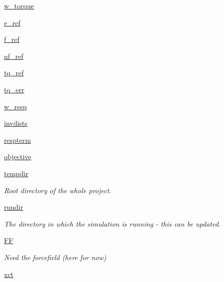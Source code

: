 \begin{DoxyCompactItemize}
\hyperlink{classforcebalance_1_1abinitio_1_1AbInitio_ab4468582c2c010bec490e65a34cdc40a}{w\-\_\-torque}
\item 
\hyperlink{classforcebalance_1_1abinitio_1_1AbInitio_a0fa6ba3ce272657e4f284267b35574ad}{e\-\_\-ref}
\item 
\hyperlink{classforcebalance_1_1abinitio_1_1AbInitio_a945a7463f68474234fa8fdfe93888ff1}{f\-\_\-ref}
\item 
\hyperlink{classforcebalance_1_1abinitio_1_1AbInitio_ad83ddb614190a3c3e647060ce3e063ad}{nf\-\_\-ref}
\item 
\hyperlink{classforcebalance_1_1abinitio_1_1AbInitio_a35ffa4510b557dd4fbce2cd8276fa09b}{tq\-\_\-ref}
\item 
\hyperlink{classforcebalance_1_1abinitio_1_1AbInitio_a36857e469f48d8bddbd3b288a92cac10}{tq\-\_\-err}
\item 
\hyperlink{classforcebalance_1_1abinitio_1_1AbInitio_ab949767e48e84f747f0e84c304d80004}{w\-\_\-resp}
\item 
\hyperlink{classforcebalance_1_1abinitio_1_1AbInitio_ac90a96916a049717e14bc1f757577f24}{invdists}
\item 
\hyperlink{classforcebalance_1_1abinitio_1_1AbInitio_ac4f8e85daeccb2e46b724eddc76d38e1}{respterm}
\item 
\hyperlink{classforcebalance_1_1abinitio_1_1AbInitio_ae27974d01fbc7d485ce3e049a54943bc}{objective}
\item 
\hyperlink{classforcebalance_1_1target_1_1Target_aede2856573b890cd47054ad36937d6f6}{tempdir}
\begin{DoxyCompactList}\small\item\em \-Root directory of the whole project. \end{DoxyCompactList}\item 
\hyperlink{classforcebalance_1_1target_1_1Target_a1da470037ef61c22dc44beb85cfa01a9}{rundir}
\begin{DoxyCompactList}\small\item\em \-The directory in which the simulation is running -\/ this can be updated. \end{DoxyCompactList}\item 
\hyperlink{classforcebalance_1_1target_1_1Target_a796dc30a19a60c63fb43b088d40a963f}{\-F\-F}
\begin{DoxyCompactList}\small\item\em \-Need the forcefield (here for now) \end{DoxyCompactList}\item 
\hyperlink{classforcebalance_1_1target_1_1Target_ad4cd0ab38d8fc97d3e7a6e22ce130a16}{xct}

\end{DoxyCompactItemize}
